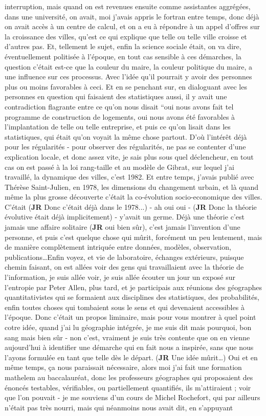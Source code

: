 \documentclass[12pt]{article}
\begin{document}
interruption, mais quand on est revenues ensuite comme assistantes aggrégées, dans une université, on avait, moi j'avais appris le fortran entre temps, donc déjà on avait accès à un centre de calcul, et on a eu à répondre à un appel d'offres sur la croissance des villes, qu'est ce qui explique que telle ou telle ville croisse et d'autres pas. Et, tellement le sujet, enfin la science sociale était, on va dire, éventuellement politisée à l'époque, en tout cas sensible à ces démarches, la question c'était est-ce que la couleur du maire, la couleur politique du maire, a une influence sur ces processus. Avec l'idée qu'il pourrait y avoir des personnes plus ou moins favorables à ceci. Et en se penchant sur, en dialoguant avec les personnes en question qui faisaient des statistiques aussi, il y avait une contradiction flagrante entre ce qu'on nous disait ``oui nous avons fait tel programme de construction de logements, oui nous avons été favorables à l'implantation de telle ou telle entreprise, et puis ce qu'on lisait dans les statistiques, qui était qu'on voyait la même chose partout. D'où l'intérêt déjà pour les régularités - pour observer des régularités, ne pas se contenter d'une explication locale, et donc assez vite, je sais plus sous quel déclencheur, en tout cas on est passé à la loi rang-taille et au modèle de Gibrat, sur lequel j'ai travaillé, la dynamique des villes, c'est 1982. Et entre temps, j'avais publié avec Thérèse Saint-Julien, en 1978, les dimensions du changement urbain, et là quand même la plus grosse découverte c'était la co-évolution socio-economique des villes. C'était (\textbf{JR} Donc c'était déjà dans le 1978...) - ah oui oui - (\textbf{JR} Donc la théorie évolutive était déjà implicitement) - y'avait un germe. Déjà une théorie c'est jamais une affaire solitaire (\textbf{JR} oui bien sûr), c'est jamais l'invention d'une personne, et puis c'est quelque chose qui mûrit, forcément un peu lentement, mais de manière complètement intriquée entre données, modèles, observation, publications\ldots Enfin voyez, et vie de laboratoire, échanges extérieurs, puisque chemin faisant, on est allées voir des gens qui travaillaient avec la théorie de l'information, je suis allée voir, je suis allée écouter un jour un exposé sur l'entropie par Peter Allen, plus tard, et je participais aux réunions des géographes quantitativistes qui se formaient aux disciplines des statistiques, des probabilités, enfin toutes choses qui tombaient sous le sens et qui devenaient accessibles à l'époque. Donc c'était un propos liminaire, mais pour vous montrer à quel point cotre idée, quand j'ai lu géographie intégrée, je me suis dit mais pourquoi, bon sang mais bien sûr - non c'est, vraiment je suis très contente que on en vienne aujourd'hui à identifier une démarche qui en fait nous a inspirée, sans que nous l'ayons formulée en tant que telle dès le départ. (\textbf{JR} Une idée mûrit\ldots ) Oui et en même temps, ça nous paraissait nécessaire, alors moi j'ai fait une formation mathelem au baccalauréat, donc les professeurs géographes qui proposaient des énoncés testables, vérifiables, ou partiellement quantifiés, ils m'attiraient ; voir que l'on pouvait - je me souviens d'un cours de Michel Rochefort, qui par ailleurs n'était pas très nourri, mais qui néanmoins nous avait dit, en s'appuyant 
\end{document}
